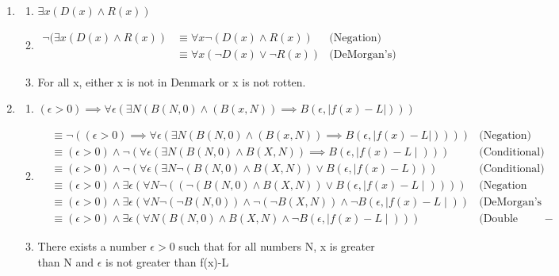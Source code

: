 \documentclass{article}
\theoremstyle{definition}
\begin{document}
\begin{enumerate}[label = \alph*)]
    \item
    
    \begin{enumerate}[label = \alph*.]
        \item
        $\exists x (D(x) \wedge R(x))$
        \item 
        \begin{align*}
            \neg(\exists x(D(x)\wedge R(x)) &\equiv \forall x \neg (D(x) \wedge R(x)) &\text{(Negation)} \\
            &\equiv \forall x(\neg D(x) \vee \neg R(x)) &\text{(DeMorgan's)}
        \end{align*}
        \item For all x, either x is not in Denmark or x is not rotten.
    \end{enumerate}
    
    \item
    \begin{enumerate}[label = \alph*)]
        \item
        $(\epsilon > 0) \implies \forall \epsilon (\exists N(B(N,0)\wedge(B(x,N)) \implies B(\epsilon , |f(x)-L|)))$
        
        \item
        \begin{align*}
            &\equiv\neg((\epsilon > 0) \implies \forall \epsilon (\exists N(B(N,0)\wedge(B(x,N)) \implies B(\epsilon , |f(x)-L|))))&\text{(Negation)} \\
            &\equiv (\epsilon>0) \wedge \neg(\forall \epsilon(\exists N(B(N,0)\wedge B(X,N))\implies B(\epsilon, \mid f(x)-L \mid ))) &\text{(Conditional)}\\
            &\equiv (\epsilon >0) \wedge \neg(\forall \epsilon (\exists N \neg (B(N,0) \wedge B(X, N)) \vee B (\epsilon, \mid f(x)-L))) &\text{(Conditional)}\\
            &\equiv (\epsilon >0) \wedge \exists \epsilon (\forall N \neg((\neg (B(N,0) \wedge B(X,N)) \vee B(\epsilon, \mid f(x)-L\mid )))) &\text{(Negation 2x)}\\
            &\equiv (\epsilon >0) \wedge \exists \epsilon (\forall N \neg (\neg B(N,0)) \wedge \neg (\neg B(X,N)) \wedge \neg B(\epsilon, \mid f(x) - L \mid )) &\text{(DeMorgan's 2x)}\\
            &\equiv (\epsilon >0) \wedge \exists \epsilon (\forall N(B(N,0) \wedge B(X,N) \wedge \neg B(\epsilon, \mid f(x)-L\mid ))) &\text{(Double Neg)}
            -
        \end{align*}
        
        \item
        There exists a number $\epsilon > 0$ such that for all numbers N, x is greater than N and $\epsilon$ is not greater than f(x)-L
    \end{enumerate}
\end{enumerate}
\end{document}
